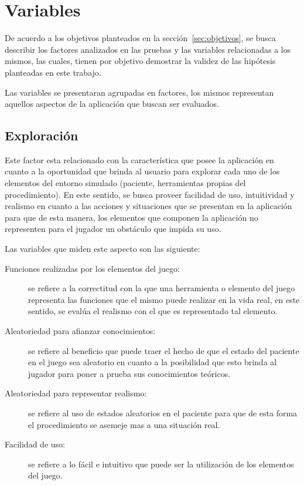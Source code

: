 
\section{Variables}
\label{sec:variables}

De acuerdo a los objetivos planteados en la sección~\ref{sec:objetivos}, se
busca describir los factores analizados en las pruebas y las variables
relacionadas a los mismos, las cuales, tienen por objetivo demostrar la validez
de las hipótesis planteadas en este trabajo.

Las variables se presentaran agrupadas en factores, los mismos representan
aquellos aspectos de la aplicación que buscan ser evaluados.

\subsection{Exploración}

Este factor esta relacionado con la característica que posee la aplicación en
cuanto a la oportunidad que brinda al usuario para explorar cada uno de los
elementos del entorno simulado (paciente, herramientas propias del
procedimiento). En este sentido, se busca proveer facilidad de uso, intuitividad
y realismo en cuanto a las acciones y situaciones que se presentan en la
aplicación para que de esta manera, los elementos que componen la aplicación no
representen para el jugador un obstáculo que impida su uso.

Las variables que miden este aspecto son las siguiente:

\begin{description}

\item [Funciones realizadas por los elementos del juego:] se refiere a la
    correctitud con la que una herramienta o elemento del juego representa las
    funciones que el mismo puede realizar en la vida real, en este sentido, se
    evalúa el realismo con el que es representado tal elemento.

\item [Aleatoriedad para afianzar conocimientos:] se refiere al beneficio que
    puede traer el hecho de que el estado del paciente en el juego sea aleatorio
    en cuanto a la posibilidad que esto brinda al jugador para poner a prueba
    sus conocimientos teóricos.

\item [Aleatoriedad para representar realismo:] se refiere al uso de estados
    aleatorios en el paciente para que de esta forma el procedimiento se asemeje
    mas a una situación real.

\item [Facilidad de uso:] se refiere a lo fácil e intuitivo  que puede ser la
    utilización de los elementos del juego.

\end{description}

